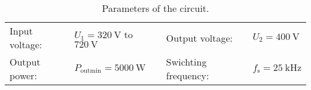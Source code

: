 \begin{table}[ht]
    \centering  %
    \begin{tabular}{llll}
        \toprule
        
        Input voltage: &  $U_{\mathrm{1}} = \SI{320}{\volt}$ to $\SI{720}{\volt}$ & Output voltage: & $U_{\mathrm{2}} = \SI{400}{\volt}$ \\ 
        Output power: & $P_{\mathrm{outmin}} = \SI{5000}{\watt}$ & Swichting frequency: & $f_{\mathrm{s}} = \SI{25}{\kilo\hertz}$ \\ 
        \bottomrule
    \end{tabular}
    \caption{Parameters of the circuit.}  %
    \label{table:Parameters of the circuit}
\end{table}